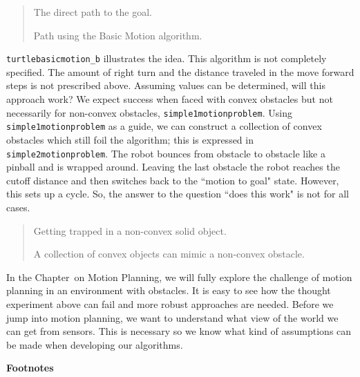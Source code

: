 \begin{quote}
The direct path to the goal.

Path using the Basic Motion algorithm.
\end{quote}

\texttt{turtlebasicmotion\_b} illustrates the idea. This algorithm is
not completely specified. The amount of right turn and the distance
traveled in the move forward steps is not prescribed above. Assuming
values can be determined, will this approach work? We expect success
when faced with convex obstacles but not necessarily for non-convex
obstacles, \texttt{simple1motionproblem}. Using
\texttt{simple1motionproblem} as a guide, we can construct a collection
of convex obstacles which still foil the algorithm; this is expressed in
\texttt{simple2motionproblem}. The robot bounces from obstacle to
obstacle like a pinball and is wrapped around. Leaving the last obstacle
the robot reaches the cutoff distance and then switches back to the
``motion to goal" state. However, this sets up a cycle. So, the answer
to the question ``does this work" is not for all cases.

\begin{quote}
Getting trapped in a non-convex solid object.

A collection of convex objects can mimic a non-convex obstacle.
\end{quote}

In the Chapter~on Motion Planning, we will fully explore the challenge
of motion planning in an environment with obstacles. It is easy to see
how the thought experiment above can fail and more robust approaches are
needed. Before we jump into motion planning, we want to understand what
view of the world we can get from sensors. This is necessary so we know
what kind of assumptions can be made when developing our algorithms.

\textbf{Footnotes}
